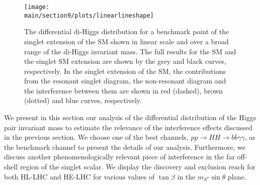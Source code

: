 \begin{figure}[t]  
  \centering
  \texttt{[image: \\main/section9/plots/linearlineshape]}
  \caption{
  The differential di-Higgs distribution for a benchmark point of the singlet extension of the SM shown in linear scale and over a broad range of the di-Higgs invariant mass. The full results for the SM and the singlet SM extension  are shown by the  grey and black curves, respectively. In the singlet extension of the SM, the contributions from the resonant singlet diagram, the non-resonant diagram and the interference between them are shown in red (dashed), brown (dotted) and blue curves, respectively.  
  }
  \label{fig:phenoshape} 
\end{figure}

We present in this section our analysis of the differential distribution of the Higgs pair invariant mass to estimate the relevance of the interference effects discussed in the previous section. We choose one of the best channels, $pp\to HH \to b\bar b \gamma\gamma$, as the benchmark channel to present the details of our analysis. Furthermore, we discuss another phenomenologically relevant piece of interference in the far off-shell region of the singlet scalar. We display the discovery and exclusion reach  for both HL-LHC and HE-LHC  for various values of $\tan\beta$ in the $m_S$-$\sin\theta$ plane. 

